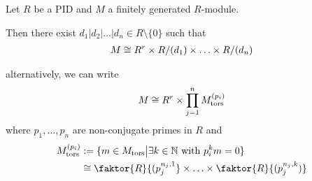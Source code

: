 \begin{thm}
  Let $R$ be a PID and $M$ a finitely generated $R$-module.

  Then there exist $d_1|d_2| \ldots |d_n \in R \setminus \{0\}$ such that
  \begin{align*}
    M \cong R^{r} \times R/(d_1) \times \ldots \times R/(d_n)
  \end{align*}

  alternatively, we can write
  \begin{align*}
    M \cong R^{r} \times \prod_{j=1}^{n} M_{\text{tors}}^{(p_i)}
  \end{align*}
  where $p_1,\ldots,p_n$ are non-conjugate primes in $R$ and
  \begin{align*}
    M_{\text{tors}}^{(p_i)} &:= \{m \in M_{\text{tors}} \big\vert \exists k \in \N \text{ with } p_i^{k}m = 0 \} \\
                            &\iso \faktor{R}{(p_j^{n_j,1}} \times \ldots \times
                            \faktor{R}{(p_j^{n_j,k})}
  \end{align*}
\end{thm}


